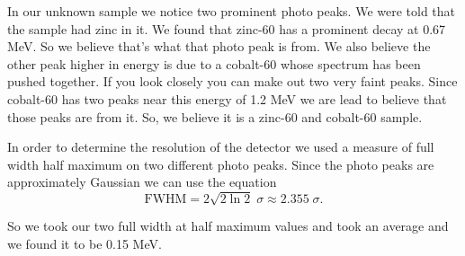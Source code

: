 \documentclass[12pt letterpaper]{article}
\begin{document}
In our unknown sample we notice two prominent photo peaks. We were told that the sample had zinc in it. We found that zinc-60 has a prominent decay at 0.67 MeV. So we believe that's what that photo peak is from. We also believe the other peak higher in energy is due to a cobalt-60 whose spectrum has been pushed together. If you look closely you can make out two very faint peaks. Since cobalt-60 has two peaks near this energy of 1.2 MeV we are lead to believe that those peaks are from it. So, we believe it is a zinc-60 and cobalt-60 sample. 

In order to determine the resolution of the detector we used a measure of full width half maximum on two different photo peaks. Since the photo peaks are approximately Gaussian we can use the equation 
\begin{equation}
 \mathrm{FWHM} =   2\sqrt{2 \ln 2 } \; \sigma \approx 2.355 \; \sigma.
\end{equation}

So we took our two full width at half maximum values and took an average and we found it to be 0.15 MeV. 
\end{document}
